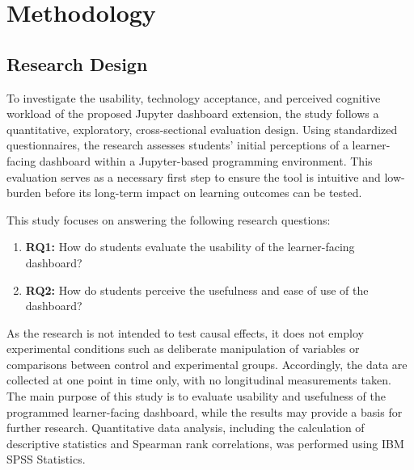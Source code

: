 \section{Methodology}

\subsection{Research Design}
To investigate the usability, technology acceptance, and perceived cognitive workload of the proposed Jupyter dashboard extension, the study follows a quantitative, exploratory, cross-sectional evaluation design. Using standardized questionnaires, the research assesses students' initial perceptions of a learner-facing dashboard within a Jupyter-based programming environment. This evaluation serves as a necessary first step to ensure the tool is intuitive and low-burden before its long-term impact on learning outcomes can be tested.

This study focuses on answering the following research questions:
\begin{enumerate}
    \item \textbf{RQ1:} How do students evaluate the usability of the learner-facing dashboard?
    \item \textbf{RQ2:} How do students perceive the usefulness and ease of use of the dashboard?
\end{enumerate}
As the research is not intended to test causal effects, it does not employ experimental conditions such as deliberate manipulation of variables or comparisons between control and experimental groups. Accordingly, the data are collected at one point in time only, with no longitudinal measurements taken. The main purpose of this study is to evaluate usability and usefulness of the programmed learner-facing dashboard, while the results may provide a basis for further research.
Quantitative data analysis, including the calculation of descriptive statistics and Spearman rank correlations, was performed using IBM SPSS Statistics.



